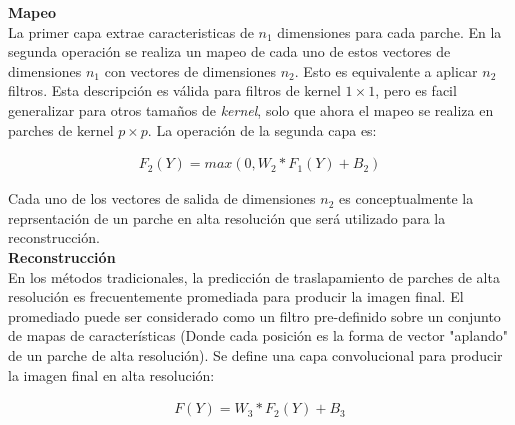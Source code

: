\textbf{Mapeo}\\
La primer capa extrae caracteristicas de $n_1$ dimensiones para cada parche. En la segunda operación se realiza un mapeo de cada
uno de estos vectores de dimensiones $n_1$ con vectores de dimensiones $n_2$. Esto es equivalente a aplicar $n_2$ filtros. Esta
descripción es válida para filtros de kernel $1\times1$, pero es facil generalizar para otros tamaños de \emph{kernel}, solo que
ahora el mapeo se realiza en parches de kernel $p\times p$. La operación de la segunda capa es:

\begin{align}
    \label{eqn:SRCNN_SecondLayer}
    F_2(Y)=max(0,W_2*F_1(Y)+B_2)
\end{align}

Cada uno de los vectores de salida de dimensiones $n_2$ es conceptualmente la reprsentación de un parche en alta resolución que
será utilizado para la reconstrucción.\\

\textbf{Reconstrucción}\\
En los métodos tradicionales, la predicción de traslapamiento de parches de alta resolución es frecuentemente promediada para
producir la imagen final. El promediado puede ser considerado como un filtro pre-definido sobre un conjunto de mapas de
características (Donde cada posición es la forma de vector "aplando" de un parche de alta resolución). Se define una capa
convolucional para producir la imagen final en alta resolución:

\begin{align}
    \label{eqn:SRCNN_ThirdLayer}
    F(Y)=W_3*F_2(Y)+B_3
\end{align}